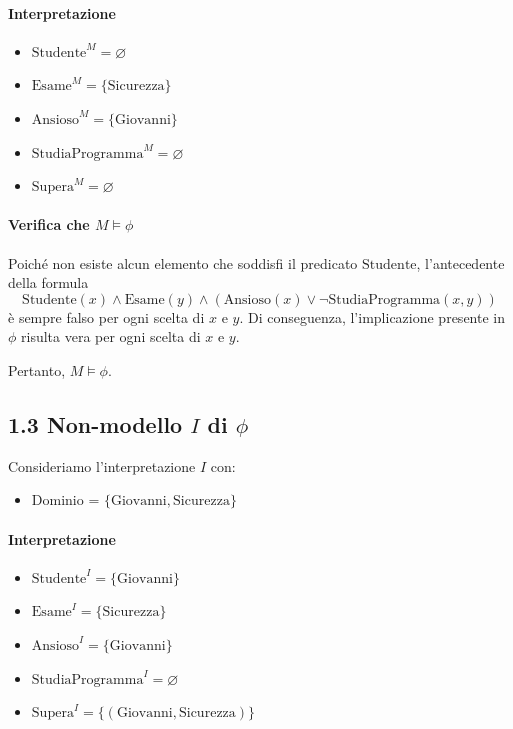 \documentclass[a4paper,11pt]{article}
\begin{document}
\paragraph{Interpretazione}
\begin{itemize}
  \item $\mathrm{Studente}^M = \varnothing$
  \item $\mathrm{Esame}^M = \{\mathrm{Sicurezza}\}$
  \item $\mathrm{Ansioso}^M = \{\mathrm{Giovanni}\}$
  \item $\mathrm{StudiaProgramma}^M = \varnothing$
  \item $\mathrm{Supera}^M = \varnothing$
\end{itemize}

\paragraph{Verifica che $M \models \phi$}

Poiché non esiste alcun elemento che soddisfi il predicato $\mathrm{Studente}$, l'antecedente della formula
\[
\mathrm{Studente}(x) \land \mathrm{Esame}(y) \land \left(\mathrm{Ansioso}(x) \lor \neg \mathrm{StudiaProgramma}(x,y)\right)
\]
è sempre falso per ogni scelta di $x$ e $y$. Di conseguenza, l'implicazione presente in $\phi$ risulta vera per ogni scelta di $x$ e $y$.

Pertanto, $M \models \phi$.

\newpage

\subsection*{1.3 Non-modello $I$ di $\phi$}

Consideriamo l'interpretazione $I$ con:
\begin{itemize}
  \item Dominio = $\{\mathrm{Giovanni}, \mathrm{Sicurezza}\}$
\end{itemize}

\paragraph{Interpretazione}
\begin{itemize}
  \item $\mathrm{Studente}^I = \{\mathrm{Giovanni}\}$
  \item $\mathrm{Esame}^I = \{\mathrm{Sicurezza}\}$
  \item $\mathrm{Ansioso}^I = \{\mathrm{Giovanni}\}$
  \item $\mathrm{StudiaProgramma}^I = \varnothing$
  \item $\mathrm{Supera}^I = \{(\mathrm{Giovanni}, \mathrm{Sicurezza})\}$
\end{itemize}
\end{document}
